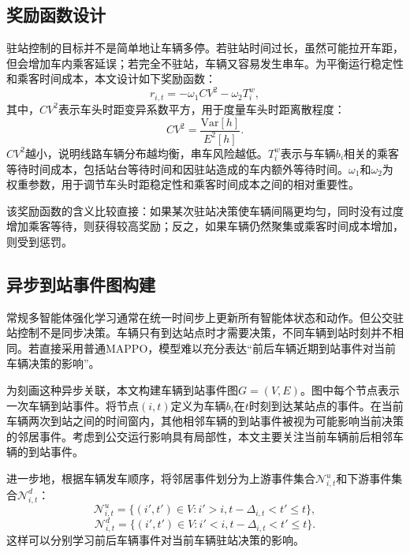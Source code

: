 \documentclass[UTF8,zihao=-4,fontset=none]{ctexart}
\begin{document}
\subsection{奖励函数设计}

驻站控制的目标并不是简单地让车辆多停。若驻站时间过长，虽然可能拉开车距，但会增加车内乘客延误；若完全不驻站，车辆又容易发生串车。为平衡运行稳定性和乘客时间成本，本文设计如下奖励函数：
\begin{equation}
r_{i,t}=-\omega_1 CV^2-\omega_2 T_i^w,
\end{equation}
其中，$CV^2$表示车头时距变异系数平方，用于度量车头时距离散程度：
\begin{equation}
CV^2=\frac{\mathrm{Var}[h]}{E^2[h]}.
\end{equation}
$CV^2$越小，说明线路车辆分布越均衡，串车风险越低。$T_i^w$表示与车辆$b_i$相关的乘客等待时间成本，包括站台等待时间和因驻站造成的车内额外等待时间。$\omega_1$和$\omega_2$为权重参数，用于调节车头时距稳定性和乘客时间成本之间的相对重要性。

该奖励函数的含义比较直接：如果某次驻站决策使车辆间隔更均匀，同时没有过度增加乘客等待，则获得较高奖励；反之，如果车辆仍然聚集或乘客时间成本增加，则受到惩罚。

\subsection{异步到站事件图构建}

常规多智能体强化学习通常在统一时间步上更新所有智能体状态和动作。但公交驻站控制不是同步决策。车辆只有到达站点时才需要决策，不同车辆到站时刻并不相同。若直接采用普通MAPPO，模型难以充分表达“前后车辆近期到站事件对当前车辆决策的影响”。

为刻画这种异步关联，本文构建车辆到站事件图$G=(V,E)$。图中每个节点表示一次车辆到站事件。将节点$(i,t)$定义为车辆$b_i$在$t$时刻到达某站点的事件。在当前车辆两次到站之间的时间窗内，其他相邻车辆的到站事件被视为可能影响当前决策的邻居事件。考虑到公交运行影响具有局部性，本文主要关注当前车辆前后相邻车辆的到站事件。

进一步地，根据车辆发车顺序，将邻居事件划分为上游事件集合$\mathcal{N}^u_{i,t}$和下游事件集合$\mathcal{N}^d_{i,t}$：
\begin{equation}
\mathcal{N}^u_{i,t}=\{(i',t')\in V:i'>i,t-\Delta_{i,t}<t'\leq t\},
\end{equation}
\begin{equation}
\mathcal{N}^d_{i,t}=\{(i',t')\in V:i'<i,t-\Delta_{i,t}<t'\leq t\}.
\end{equation}
这样可以分别学习前后车辆事件对当前车辆驻站决策的影响。
\end{document}
